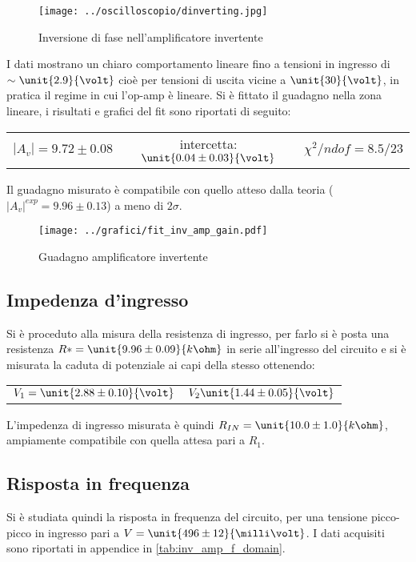 \documentclass[10pt,a4paper]{article}
\begin{document}
\begin{figure}[H]
	\centering
	\texttt{[image: ../oscilloscopio/dinverting.jpg]}
	\caption{Inversione di fase nell'amplificatore invertente}
	\label{fig:inv_amp}
\end{figure}

I dati mostrano un chiaro comportamento lineare fino a tensioni in ingresso di $\sim \unit{2.9}{\volt}$ cioè per tensioni di uscita vicine a $\unit{30}{\volt}$, in pratica il regime in cui l'op-amp è lineare. Si è fittato il guadagno nella zona lineare, i risultati e grafici del fit sono riportati di seguito:

\begin{table}[H]
	\centering
	\begin{tabular}{ccc}
		$|A_v| = 9.72 \pm 0.08$  & intercetta: $\unit{0.04 \pm 0.03}{\volt}$ & $\chi^2/ndof= 8.5 / 23$
	\end{tabular}
\end{table}
Il guadagno misurato è compatibile con quello atteso dalla teoria ($|A_v|^{exp} = 9.96 \pm 0.13$) a meno di $2\sigma$.
\begin{figure}[H]
	\centering
	\texttt{[image: ../grafici/fit\_inv\_amp\_gain.pdf]}
	\caption{Guadagno amplificatore invertente}
	\label{fig:inv_amp_gain}
\end{figure}
 
\subsection{Impedenza d'ingresso}
Si è proceduto alla misura della resistenza di ingresso, per farlo si è posta una resistenza $R* = \unit{9.96 \pm 0.09}{k\ohm}$ in serie all'ingresso del circuito e si è misurata la caduta di potenziale ai capi della stesso ottenendo:

\begin{table}[H]
	\centering
	\begin{tabular}{cc}
		$V_1 = \unit{2.88 \pm 0.10}{\volt}$  &  $V_2\unit{1.44 \pm 0.05}{\volt}$
	\end{tabular}
\end{table}

L'impedenza di ingresso misurata è quindi $R_{IN}=\unit{10.0 \pm 1.0}{k\ohm}$, ampiamente compatibile con quella attesa pari a $R_1$.

\subsection{Risposta in frequenza}
Si è studiata quindi la risposta in frequenza del circuito, per una tensione picco-picco in ingresso pari a $V = \unit{496 \pm 12}{\milli\volt}$. I dati acquisiti sono riportati in appendice in \tablename{\ref{tab:inv_amp_f_domain}}.
\end{document}
